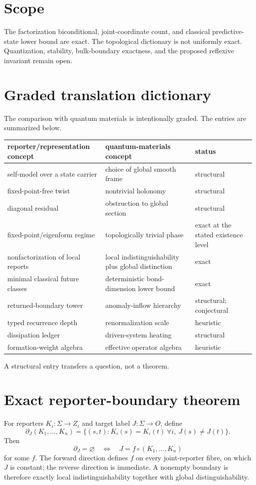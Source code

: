 \documentclass[11pt,a4paper]{article}
\begin{document}
\section{Scope}
The factorization biconditional, joint-coordinate count, and classical predictive-state lower bound are exact. The topological dictionary is not uniformly exact. Quantization, stability, bulk-boundary exactness, and the proposed reflexive invariant remain open.


\section{Graded translation dictionary}
The comparison with quantum materials is intentionally graded. The entries are summarized below.
\begin{longtable}{p{.31\linewidth}p{.37\linewidth}>{\raggedright\arraybackslash}p{.19\linewidth}}
\toprule
reporter/representation concept&quantum-materials concept&status\\\midrule
self-model over a state carrier&choice of global smooth frame&structural\\
fixed-point-free twist&nontrivial holonomy&structural\\
diagonal residual&obstruction to global section&structural\\
fixed-point/eigenform regime&topologically trivial phase&exact at the stated existence level\\
nonfactorization of local reports&local indistinguishability plus global distinction&exact\\
minimal classical future classes&deterministic bond-dimension lower bound&exact\\
returned-boundary tower&anomaly-inflow hierarchy&structural; conjectural\\
typed recurrence depth&renormalization scale&heuristic\\
dissipation ledger&driven-system heating&structural\\
formation-weight algebra&effective operator algebra&heuristic\\
\bottomrule
\end{longtable}
A structural entry transfers a question, not a theorem.

\section{Exact reporter-boundary theorem}
For reporters $K_i:\Sigma\to Z_i$ and target label $J:\Sigma\to O$, define
\begin{equation}
\partial_J(K_1,\ldots,K_n)=
\{(s,t):K_i(s)=K_i(t)\ \forall i,\ J(s)\ne J(t)\}.
\end{equation}
Then
\begin{equation}
\partial_J=\varnothing
\quad\Longleftrightarrow\quad
J=f\circ(K_1,\ldots,K_n)
\end{equation}
for some $f$. The forward direction defines $f$ on every joint-reporter fibre, on which $J$ is constant; the reverse direction is immediate. A nonempty boundary is therefore exactly local indistinguishability together with global distinguishability.
\end{document}
